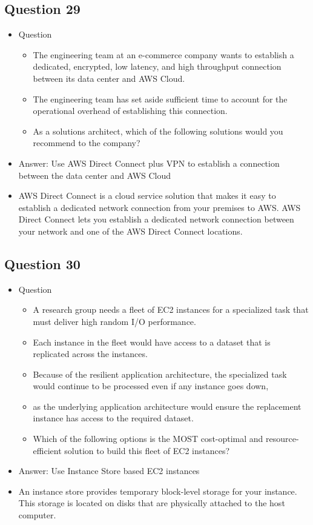 \documentclass[]{scrartcl}
\begin{document}
\subsection{Question 29}
\begin{itemize}
	\item Question
	\begin{itemize}
		\item The engineering team at an e-commerce company wants to establish a dedicated, encrypted, low latency, and high throughput connection between its data center and AWS Cloud. 
		\item The engineering team has set aside sufficient time to account for the operational overhead of establishing this connection.
		\item As a solutions architect, which of the following solutions would you recommend to the company?
	\end{itemize}
	\item Answer: Use AWS Direct Connect plus VPN to establish a connection between the data center and AWS Cloud
	\item AWS Direct Connect is a cloud service solution that makes it easy to establish a dedicated network connection from your premises to AWS. AWS Direct Connect lets you establish a dedicated network connection between your network and one of the AWS Direct Connect locations.
\end{itemize}

\subsection{Question 30}
\begin{itemize}
	\item Question
	\begin{itemize}
		\item A research group needs a fleet of EC2 instances for a specialized task that must deliver high random I/O performance. 
		\item Each instance in the fleet would have access to a dataset that is replicated across the instances. \item Because of the resilient application architecture, the specialized task would continue to be processed even if any instance goes down, 
		\item as the underlying application architecture would ensure the replacement instance has access to the required dataset.
		\item Which of the following options is the MOST cost-optimal and resource-efficient solution to build this fleet of EC2 instances?
	\end{itemize}
	\item Answer: Use Instance Store based EC2 instances
	\item An instance store provides temporary block-level storage for your instance. This storage is located on disks that are physically attached to the host computer.
\end{itemize}
\end{document}
